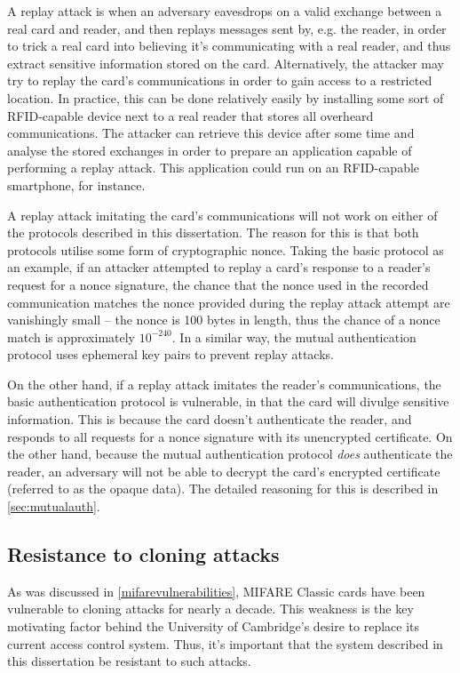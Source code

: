\documentclass[12pt,a4paper,twoside,openright]{report}
\begin{document}
A replay attack is when an adversary eavesdrops on a valid exchange between a real card and reader, and then replays messages sent by, e.g. the reader, in order to trick a real card into believing it's communicating with a real reader, and thus extract sensitive information stored on the card. Alternatively, the attacker may try to replay the card's communications in order to gain access to a restricted location. In practice, this can be done relatively easily by installing some sort of RFID-capable device next to a real reader that stores all overheard communications. The attacker can retrieve this device after some time and analyse the stored exchanges in order to prepare an application capable of performing a replay attack. This application could run on an RFID-capable smartphone, for instance.

A replay attack imitating the card's communications will not work on either of the protocols described in this dissertation. The reason for this is that both protocols utilise some form of cryptographic nonce. Taking the basic protocol as an example, if an attacker attempted to replay a card's response to a reader's request for a nonce signature, the chance that the nonce used in the recorded communication matches the nonce provided during the replay attack attempt are vanishingly small -- the nonce is 100 bytes in length, thus the chance of a nonce match is approximately $10^{-240}$. In a similar way, the mutual authentication protocol uses ephemeral key pairs to prevent replay attacks.

On the other hand, if a replay attack imitates the reader's communications, the basic authentication protocol is vulnerable, in that the card will divulge sensitive information. This is because the card doesn't authenticate the reader, and responds to all requests for a nonce signature with its unencrypted certificate. On the other hand, because the mutual authentication protocol \emph{does} authenticate the reader, an adversary will not be able to decrypt the card's encrypted certificate (referred to as the opaque data). The detailed reasoning for this is described in \autoref{sec:mutualauth}.

\subsection{Resistance to cloning attacks}

As was discussed in \autoref{mifarevulnerabilities}, MIFARE Classic cards have been vulnerable to cloning attacks for nearly a decade. This weakness is the key motivating factor behind the University of Cambridge's desire to replace its current access control system. Thus, it's important that the system described in this dissertation be resistant to such attacks.
\end{document}
